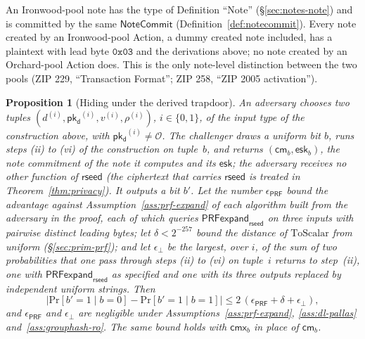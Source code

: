 \documentclass[11pt,a4paper]{article}
\newtheorem{proposition}[theorem]{Proposition}
\theoremstyle{definition}
\renewcommand{\Pr}{\mathrm{Pr}}
\newcommand{\cmsym}{\mathsf{cm}}
\newcommand{\cmx}{\mathsf{cmx}}
\newcommand{\NoteCommit}{\ensuremath{\mathsf{NoteCommit}}}
\newcommand{\pkd}{\ensuremath{\mathsf{pk_d}}}
\begin{document}
An Ironwood-pool note has the type of Definition ``Note''
(\S\ref{sec:notes-note}) and is committed by the same $\NoteCommit$
(Definition~\ref{def:notecommit}). Every note created by an Ironwood-pool
Action, a dummy created note included, has a plaintext with lead byte
$\mathtt{0x03}$ and the derivations above; no note created by an
Orchard-pool Action does. This is the only note-level distinction between the
two pools (ZIP 229, ``Transaction Format''; ZIP 258, ``ZIP 2005
activation'').

\begin{proposition}[Hiding under the derived trapdoor]%
\label{prop:cm-derived}
An adversary chooses two tuples $(d^{(i)}, \pkd^{(i)}, v^{(i)}, \rho^{(i)})$,
$i \in \{0, 1\}$, of the input type of the construction above, with
$\pkd^{(i)} \neq \mathcal{O}$. The challenger draws a uniform bit $b$, runs
steps (ii) to (vi) of the construction on tuple~$b$, and returns
$(\cmsym_b, \mathsf{esk}_b)$, the note commitment of the note it computes
and its $\mathsf{esk}$; the adversary receives no other function of
$\mathsf{rseed}$ (the ciphertext that carries $\mathsf{rseed}$ is treated in
Theorem~\ref{thm:privacy}). It outputs a bit $b'$. Let the number
$\epsilon_{\mathsf{PRF}}$ bound the advantage against
Assumption~\ref{ass:prf-expand} of each algorithm built from the adversary in
the proof, each of which queries $\mathsf{PRFexpand}_{\mathsf{rseed}}$ on
three inputs with pairwise distinct leading bytes; let $\delta < 2^{-257}$
bound the distance of $\mathrm{ToScalar}$ from uniform
(\S\ref{sec:prim-prf}); and let $\epsilon_{\bot}$ be the largest, over $i$,
of the sum of two probabilities that one pass through steps (ii) to (vi) on
tuple~$i$ returns to step~(ii), one with $\mathsf{PRFexpand}_{\mathsf{rseed}}$
as specified and one with its three outputs replaced by independent uniform
strings. Then
\[
  \bigl|\Pr[b' = 1 \mid b = 0] - \Pr[b' = 1 \mid b = 1]\bigr|
  \le 2\,(\epsilon_{\mathsf{PRF}} + \delta + \epsilon_{\bot}),
\]
and $\epsilon_{\mathsf{PRF}}$ and $\epsilon_{\bot}$ are negligible under
Assumptions~\ref{ass:prf-expand}, \ref{ass:dl-pallas}
and~\ref{ass:grouphash-ro}. The same bound holds with $\cmx_b$ in place of
$\cmsym_b$.
\end{proposition}
\end{document}
